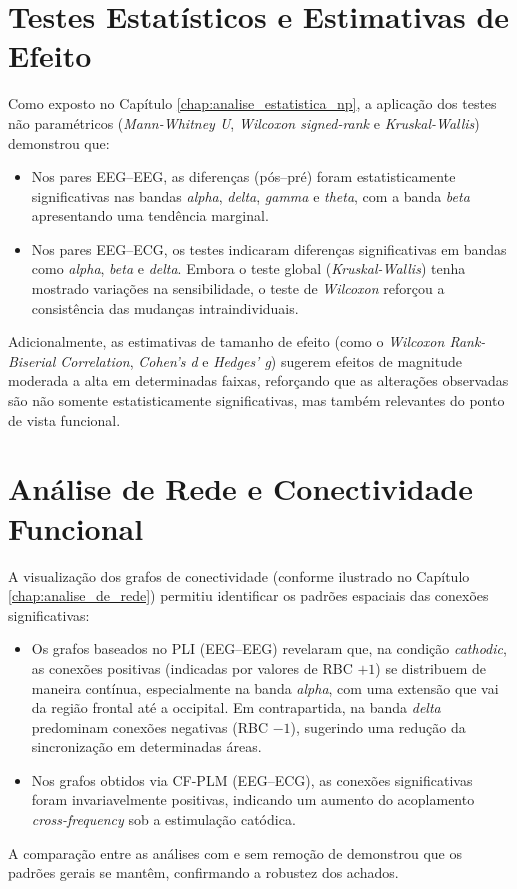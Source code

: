\section{Testes Estatísticos e Estimativas de Efeito}
Como exposto no Capítulo \ref{chap:analise_estatistica_np}, a aplicação dos testes não paramétricos (\textit{Mann-Whitney U}, \textit{Wilcoxon signed-rank} e \textit{Kruskal-Wallis}) demonstrou que:
\begin{itemize}
    \item Nos pares EEG--EEG, as diferenças (pós--pré) foram estatisticamente significativas nas bandas \emph{alpha}, \emph{delta}, \emph{gamma} e \emph{theta}, com a banda \emph{beta} apresentando uma tendência marginal.
    \item Nos pares EEG--ECG, os testes indicaram diferenças significativas em bandas como \emph{alpha}, \emph{beta} e \emph{delta}. Embora o teste global (\textit{Kruskal-Wallis}) tenha mostrado variações na sensibilidade, o teste de \textit{Wilcoxon} reforçou a consistência das mudanças intraindividuais.
\end{itemize}
Adicionalmente, as estimativas de tamanho de efeito (como o \textit{Wilcoxon Rank-Biserial Correlation}, \textit{Cohen's d} e \textit{Hedges' g}) sugerem efeitos de magnitude moderada a alta em determinadas faixas, reforçando que as alterações observadas são não somente estatisticamente significativas, mas também relevantes do ponto de vista funcional.

\section{Análise de Rede e Conectividade Funcional}
A visualização dos grafos de conectividade (conforme ilustrado no Capítulo \ref{chap:analise_de_rede}) permitiu identificar os padrões espaciais das conexões significativas:
\begin{itemize}
    \item Os grafos baseados no PLI (EEG--EEG) revelaram que, na condição \emph{cathodic}, as conexões positivas (indicadas por valores de RBC $+1$) se distribuem de maneira contínua, especialmente na banda \emph{alpha}, com uma extensão que vai da região frontal até a occipital. Em contrapartida, na banda \emph{delta} predominam conexões negativas (RBC $-1$), sugerindo uma redução da sincronização em determinadas áreas.
    \item Nos grafos obtidos via CF-PLM (EEG--ECG), as conexões significativas foram invariavelmente positivas, indicando um aumento do acoplamento \emph{cross-frequency} sob a estimulação catódica.
\end{itemize}
A comparação entre as análises com e sem remoção de  demonstrou que os padrões gerais se mantêm, confirmando a robustez dos achados.

